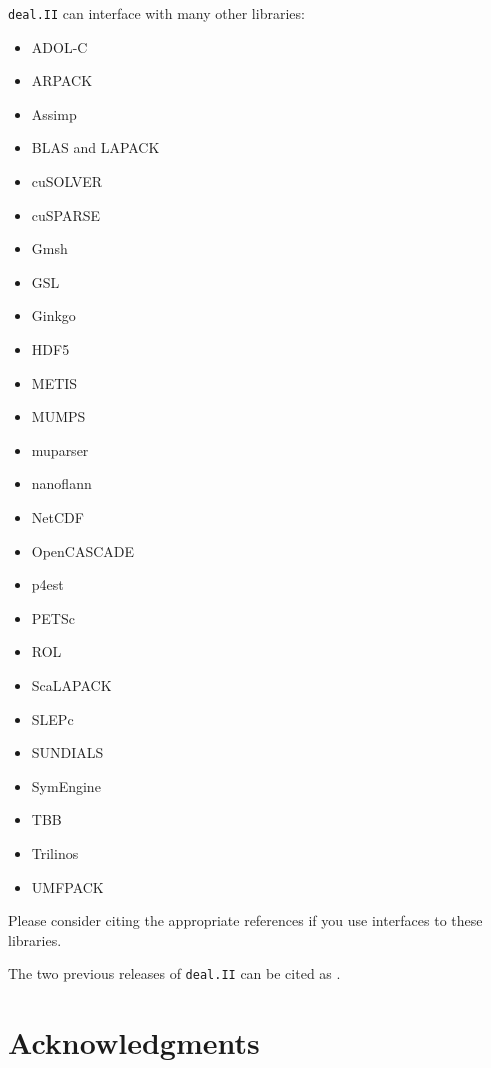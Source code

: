 \documentclass{ansarticle-preprint}
\newcommand{\specialword}[1]{\texttt{#1}}
\newcommand{\dealii}{{\specialword{deal.II}}\xspace}
\begin{document}
\dealii can interface with many other libraries:
\begin{multicols}{3}
\begin{itemize}
\item ADOL-C \cite{Griewank1996a,adol-c}
\item ARPACK \cite{arpack}
\item Assimp \cite{assimp}
\item BLAS and LAPACK \cite{lapack}
\item cuSOLVER \cite{cusolver}
\item cuSPARSE \cite{cusparse}
\item Gmsh \cite{geuzaine2009gmsh}
\item GSL \cite{gsl2016}
\item Ginkgo \cite{ginkgo-web-page}
\item HDF5 \cite{hdf5}
\item METIS \cite{karypis1998fast}
\item MUMPS \cite{ADE00,MUMPS:1,MUMPS:2,mumps-web-page}
\item muparser \cite{muparser-web-page}
\item nanoflann \cite{nanoflann}
\item NetCDF \cite{rew1990netcdf}
\item OpenCASCADE \cite{opencascade-web-page}
\item p4est \cite{Burstedde2018,p4est}
\item PETSc \cite{petsc-user-ref,petsc-web-page}
\item ROL \cite{ridzal2014rapid}
\item ScaLAPACK \cite{slug}
\item SLEPc \cite{Hernandez:2005:SSF}
\item SUNDIALS \cite{sundials}
\item SymEngine \cite{symengine-web-page}
\item TBB \cite{Rei07}
\item Trilinos \cite{trilinos,trilinos-web-page}
\item UMFPACK \cite{umfpack}
\end{itemize}
\end{multicols}
Please consider citing the appropriate references if you use interfaces to these
libraries.

The two previous releases of \dealii can be cited as
\cite{dealII85,dealII90}.


\section{Acknowledgments}
\end{document}
